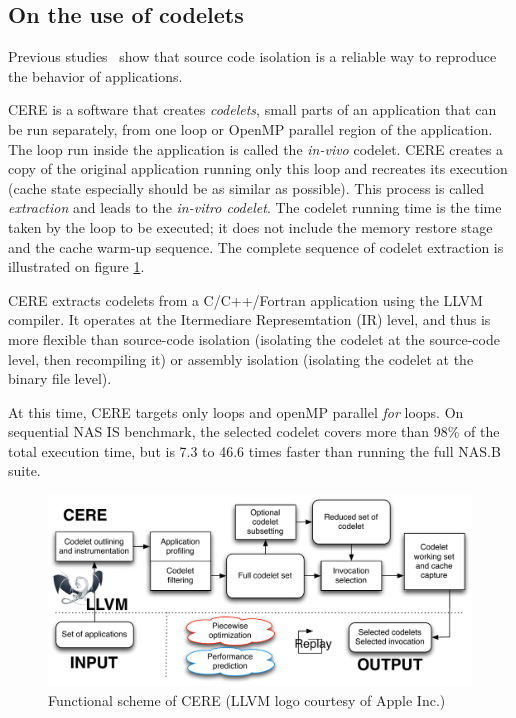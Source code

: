 \documentclass{article}
\begin{document}
\begin{multicols}{2}
\subsection{On the use of codelets}
Previous studies~\cite{CERE} show that source code isolation is a reliable way to reproduce the behavior of applications. 

CERE is a software that creates \textit{codelets}, small parts of an application that can be run separately, from one loop 
or OpenMP parallel region of the application.
The loop run inside the application is called the \textit{in-vivo} codelet. CERE creates a copy of the original application running only this loop and recreates its execution (cache state especially should be as similar as possible). This process is called \textit{extraction} and leads to the \textit{in-vitro codelet}. The codelet running time is the time taken by the loop to be executed; it does not include the memory restore stage and the cache warm-up sequence. The complete sequence of codelet extraction is illustrated on figure \ref{CERE_schema}.


CERE extracts codelets from a C/C++/Fortran application using the LLVM compiler. It operates at the Itermediare Represemtation (IR) level, and thus is more flexible than source-code isolation (isolating the codelet at the source-code level, then recompiling it) or assembly isolation (isolating the codelet at the binary file level)\cite{CERE}. 

At this time, CERE targets only loops and openMP parallel \textit{for} loops. On sequential NAS IS benchmark, the selected codelet covers more than 98\% of the total execution time, but is 7.3 to 46.6 times faster than running the full NAS.B suite.


\end{multicols}
\begin{figure}[ht]
\begin{center}
\includegraphics[width=0.85\linewidth]{cere_fonction.pdf}
\caption{\label{CERE_schema}Functional scheme of CERE (LLVM logo courtesy of Apple Inc.)}
\end{center}
\end{figure}
\end{document}
